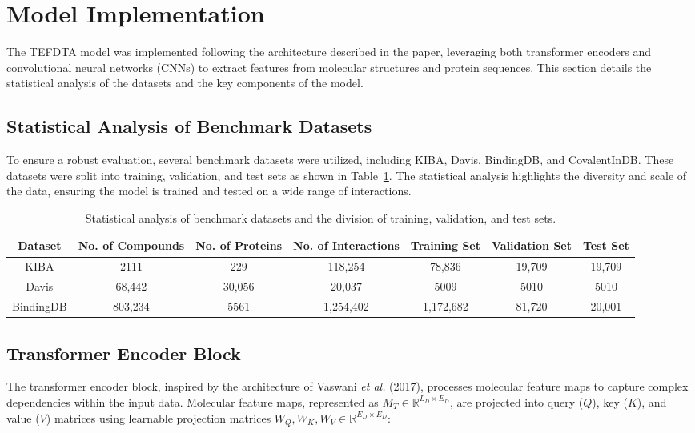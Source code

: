 \documentclass{article}
\begin{document}
\section{Model Implementation}

The TEFDTA model was implemented following the architecture described in the paper, leveraging both transformer encoders and convolutional neural networks (CNNs) to extract features from molecular structures and protein sequences. This section details the statistical analysis of the datasets and the key components of the model.

\subsection{Statistical Analysis of Benchmark Datasets}

To ensure a robust evaluation, several benchmark datasets were utilized, including KIBA, Davis, BindingDB, and CovalentInDB. These datasets were split into training, validation, and test sets as shown in Table~\ref{tab:datasets}. The statistical analysis highlights the diversity and scale of the data, ensuring the model is trained and tested on a wide range of interactions.

\begin{table}[ht]
	\centering
	\caption{Statistical analysis of benchmark datasets and the division of training, validation, and test sets.}
	\label{tab:datasets}
	\begin{tabular}{ccccccc}
		\toprule
		\textbf{Dataset} & \textbf{No. of Compounds} & \textbf{No. of Proteins} & \textbf{No. of Interactions} & \textbf{Training Set} & \textbf{Validation Set} & \textbf{Test Set} \\
		\midrule
		KIBA       & 2111     & 229    & 118,254   & 78,836  & 19,709 & 19,709 \\
		Davis      & 68,442   & 30,056 & 20,037    & 5009    & 5010   & 5010   \\
		BindingDB  & 803,234  & 5561   & 1,254,402 & 1,172,682 & 81,720 & 20,001 \\
		\bottomrule
	\end{tabular}
\end{table}

\subsection{Transformer Encoder Block}

The transformer encoder block, inspired by the architecture of Vaswani \textit{et al.} (2017), processes molecular feature maps to capture complex dependencies within the input data. Molecular feature maps, represented as $M_T \in \mathbb{R}^{L_D \times E_D}$, are projected into query ($Q$), key ($K$), and value ($V$) matrices using learnable projection matrices $W_Q, W_K, W_V \in \mathbb{R}^{E_D \times E_D}$:
\end{document}
